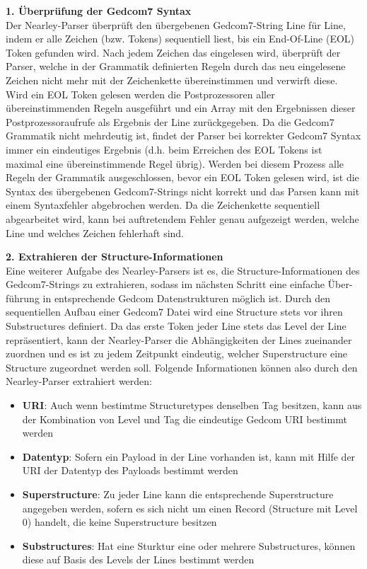 \vspace{1em}
\textbf{1. Überprüfung der Gedcom7 Syntax} \vspace{0.35em} \\
Der Nearley-Parser überprüft den übergebenen Gedcom7-String Line für Line, indem er alle Zeichen (bzw. Tokens) sequentiell liest, bis ein End-Of-Line (EOL) Token  gefunden wird. Nach jedem Zeichen das eingelesen wird, überprüft der Parser, welche in der Grammatik definierten Regeln durch das neu eingelesene Zeichen nicht mehr mit der Zeichenkette übereinstimmen und verwirft diese. Wird ein EOL Token gelesen werden die Postprozessoren aller übereinstimmenden Regeln ausgeführt und ein Array mit den Ergebnissen dieser Postprozessoraufrufe als Ergebnis der Line zurückgegeben. Da die Gedcom7 Grammatik nicht mehrdeutig ist, findet der Parser bei korrekter Gedcom7 Syntax immer ein eindeutiges Ergebnis (d.h. beim Erreichen des EOL Tokens ist maximal eine übereinstimmende Regel übrig). Werden bei diesem Prozess alle Regeln der Grammatik ausgeschlossen, bevor ein EOL Token gelesen wird, ist die Syntax des übergebenen Gedcom7-Strings nicht korrekt und das Parsen kann mit einem Syntaxfehler abgebrochen werden. Da die Zeichenkette sequentiell abgearbeitet wird, kann bei auftretendem Fehler genau aufgezeigt werden, welche Line und welches Zeichen fehlerhaft sind.

\vspace{1em}
\textbf{2. Extrahieren der Structure-Informationen} \vspace{0.35em} \\
Eine weiterer Aufgabe des Nearley-Parsers ist es, die Structure-Informationen des Gedcom7-Strings zu extrahieren, sodass im nächsten Schritt eine einfache Über-führung in entsprechende Gedcom Datenstrukturen möglich ist. Durch den sequentiellen Aufbau einer Gedcom7 Datei wird eine Structure stets vor ihren Substructures definiert. Da das erste Token jeder Line stets das Level der Line repräsentiert, kann der Nearley-Parser die Abhängigkeiten der Lines zueinander zuordnen und es ist zu jedem Zeitpunkt eindeutig, welcher Superstructure eine Structure zugeordnet werden soll. Folgende Informationen können also durch den Nearley-Parser extrahiert werden: 
\begin{itemize}
	\item \textbf{URI}: Auch wenn bestimtme Structuretypes denselben Tag besitzen, kann aus der Kombination von Level und Tag die eindeutige Gedcom URI bestimmt werden
	\item \textbf{Datentyp}: Sofern ein Payload in der Line vorhanden ist, kann mit Hilfe der URI der Datentyp des Payloads bestimmt werden
	\item \textbf{Superstructure}: Zu jeder Line kann die entsprechende Superstructure angegeben werden, sofern es sich nicht um einen Record (Structure mit Level 0) handelt, die keine Superstructure besitzen
	\item \textbf{Substructures}: Hat eine Sturktur eine oder mehrere Substructures, können diese auf Basis des Levels der Lines bestimmt werden
\end{itemize}

